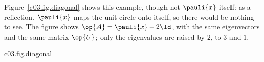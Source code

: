 Figure~\ref{c03.fig.diagonal} shows this example, though not $\pauli{x}$ itself: as a reflection,
$\pauli{x}$ maps the unit circle onto itself, so there would be nothing to see. The figure shows
$\op{A} = \pauli{x} + 2\Id$, with the same eigenvectors and the same matrix $\op{U}$; only the
eigenvalues are raised by $2$, to $3$ and $1$.

\begin{tpcfigure}{c03.fig.diagonal}
  \caption{The same operator in two bases. It shows the image of the unit circle under
    $\op{A} = \pauli{x} + 2\Id$, as an operator on $\mathbb{R}^2 \subset \mathbb{C}^2$. On the
    left, in the canonical basis $\ket{0}, \ket{1}$, the matrix is
    $\bigl(\begin{smallmatrix} 2 & 1 \\ 1 & 2 \end{smallmatrix}\bigr)$, and the image ellipse
    lies askew. On the right, in the basis $\ket{\phi_0}, \ket{\phi_1}$ of
    Equation~\eqref{c03.eq.hadamard-eigen}, the matrix is $\diag(3, 1)$, and the ellipse lies
    on the axes. The principal axes lie along the eigenvectors, the semi-axes are the eigenvalues
    $3$ and $1$. The change from left to right is the Hadamard matrix $\op{U}$ of
    Equation~\eqref{c03.eq.hadamard}.}
\end{tpcfigure}

